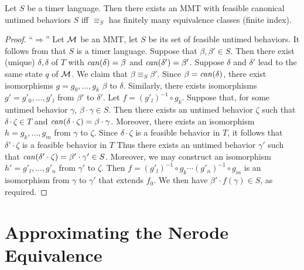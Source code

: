 \begin{theorem}
  \label{thm:bj-nerode}
Let $S$ be a timer language.
Then there exists an MMT with feasible canonical untimed behaviors $S$ iff 
$\equiv_S$ has finitely many equivalence classes (finite index).
\end{theorem}
\begin{proof} 
``$\Rightarrow$'' Let ${\mathcal M}$ be an MMT, let $S$ be its set of feasible untimed
  behaviors. It follows from  that $S$ is a timer language.
Suppose that $\beta, \beta' \in S$.
Then there exist (unique) $\delta, \delta$ of $T$ with
$\mathit{can}({\delta})=\beta$ and $\mathit{can}({\delta'})=\beta'$.
Suppose $\delta$ and $\delta'$ lead to the same state $q$ of ${\mathcal M}$.
We claim that $\beta \equiv_S \beta'$.
Since $\beta = \mathit{can}({\delta})$, there exist isomorphisms
$g = g_0 ,\ldots, g_k$  $\beta$ to $\delta$.
Similarly, there exists isomorphisms $g' = g'_0 ,\ldots, g'_l$ from
$\beta'$ to $\delta'$.
Let $f = (g'_l)^{-1} \circ g_k$.
Suppose that, for some untimed behavior $\gamma$, $\beta \cdot \gamma \in S$.
Then there exists an untimed behavior $\zeta$ such that $\delta \cdot \zeta \in T$ and $\mathit{can}({\delta \cdot \zeta}) = \beta \cdot \gamma$.
Moreover, there exists an isomorphism $h = g_k ,\ldots, g_m$ from $\gamma$ to $\zeta$.
Since $\delta \cdot \zeta$ is a feasible behavior in $T$, it follows that
$\delta' \cdot \zeta$ is a feasible behavior in $T$
Thus there exists an untimed behavior $\gamma'$ such that $\mathit{can}({\delta' \cdot \zeta}) = \beta' \cdot \gamma' \in S$.
Moreover, we may construct an isomorphism $h' = g'_l ,\ldots, g'_n$ from $\gamma'$ to $\zeta$.
Then $f = (g'_l)^{-1} \circ g_k \cdots (g'_n)^{-1} \circ g_m$ is an isomorphism from $\gamma$ to $\gamma'$ that extends $f_0$.
We then have $\beta' \cdot f(\gamma) \in S$, as required.
\end{proof}

\section{Approximating the Nerode Equivalence}
\label{sec:approx}


